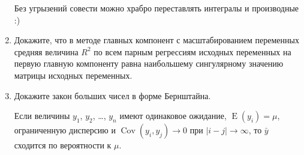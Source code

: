 \documentclass[12pt]{article}
\DeclareMathOperator{\Cov}{Cov}
\DeclareMathOperator{\E}{E}
\begin{document}
\begin{enumerate}
\begin{enumerate}
    \end{enumerate}

  Без угрызений совести можно храбро переставлять интегралы и производные :)


  \item
  Докажите, что в методе главных компонент с масштабированием переменных средняя величина $R^2$ по всем парным
  регрессиям исходных переменных на первую главную компоненту равна наибольшему сингулярному значению
  матрицы исходных переменных.

\item Докажите закон больших чисел в форме Бернштайна.

Если величины $y_1$, $y_2$, \ldots, $y_n$ имеют одинаковое ожидание, $\E(y_i) = \mu$, ограниченную дисперсию и $\Cov(y_i, y_j) \to 0$ при $|i - j|\to \infty$, то $\bar y$ сходится по вероятности к $\mu$.

\end{enumerate}
\end{document}
